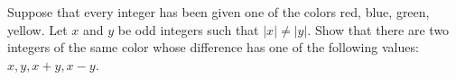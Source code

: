 Suppose that every integer has been given one of the colors red, blue, green, yellow. Let $x$ and $y$ be odd integers such that $|x| \neq |y|$. Show that there are two integers of the same color whose difference has one of the following values: $x, y, x + y, x - y$.
